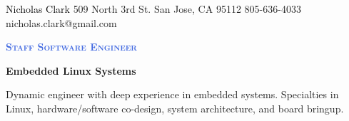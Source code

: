 \documentclass[letterpaper, 10pt]{article}
\newcommand{\NrcColorName}{Black}
\newcommand{\NrcColorTitle}{RoyalBlue}
\begin{document}
%
\nrctitle
{\textcolor{\NrcColorName}{Nicholas Clark}}
{509 North 3rd St.}
{San Jose, CA 95112}
{805-636-4033}
{nicholas.clark@gmail.com}
%
\begin{center}\par\smallskip
\textcolor{\NrcColorTitle}{\Large \textbf{\textsc{Staff Software Engineer}}}\par
\large \textbf{{Embedded Linux Systems}}\par
\smallskip
\noindent \begin{minipage}[t]{0.75\textwidth}%
\begin{center}
Dynamic engineer with deep experience in embedded systems. Specialties in
Linux, hardware/software co-design, system architecture, and board bringup.
\end{center}
\end{minipage}
\end{center}
\par \smallskip \smallskip
%
%
\end{document}
